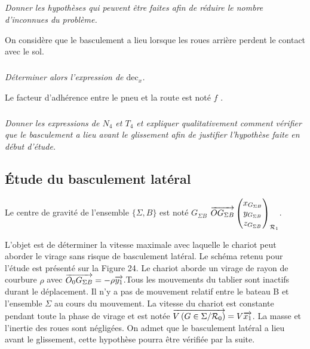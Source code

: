 \documentclass[10pt,fleqn]{article} %
\begin{document}
\begin{multicols}{2}
\begin{corrige}
\end{corrige}
\else
\fi

\subparagraph{}
\textit{Donner les hypothèses qui peuvent être faites afin de réduire le nombre d’inconnues du
problème.}
\ifprof
\begin{corrige}
\end{corrige}
\else
\fi

On considère que le basculement a lieu lorsque les roues arrière perdent le contact avec le sol.

\subparagraph{}
\textit{Déterminer alors l’expression de $\text{dec}_x$.}
\ifprof
\begin{corrige}
\end{corrige}
\else
\fi

Le facteur d’adhérence entre le pneu et la route est noté $f$ .

\subparagraph{}
\textit{Donner les expressions de $N_4$ et $T_4$ et expliquer qualitativement comment vérifier que le
basculement a lieu avant le glissement afin de justifier l’hypothèse faite en début d’étude.}
\ifprof
\begin{corrige}
\end{corrige}
\else
\fi


\subsection*{Étude du basculement latéral}

Le centre de gravité de l’ensemble $\{\Sigma , B\}$ est noté $G_{\Sigma B}$ $\overrightarrow{OG_{\Sigma B}}\begin{pmatrix}x_{G_{\Sigma B}}\\y_{G_{\Sigma B}}\\z_{G_{\Sigma B}} \end{pmatrix}_{\mathcal{R}_{1}}$.


L’objet est de déterminer la vitesse maximale avec laquelle le chariot peut aborder le virage sans
risque de basculement latéral.
Le schéma retenu pour l’étude est présenté sur la Figure 24.
Le chariot aborde un virage de rayon de courbure $\rho$ avec $\overrightarrow{O_0G_{\Sigma B}}=-\rho \overrightarrow{y_1}$.Tous les mouvements du
tablier sont inactifs durant le déplacement. Il n’y a pas de mouvement relatif entre le bateau B et
l’ensemble $\Sigma$ au cours du mouvement.
La vitesse du chariot est constante pendant toute la phase de virage et est notée $\overrightarrow{V\left( {G} \in {\Sigma}/{\mathcal{R}_{0}}\right)}=V\overrightarrow{x_1}$.
La masse et l’inertie des roues sont négligées.
On admet que le basculement latéral a lieu avant le glissement, cette hypothèse pourra être vérifiée par
la suite.


\end{multicols}
\end{document}

